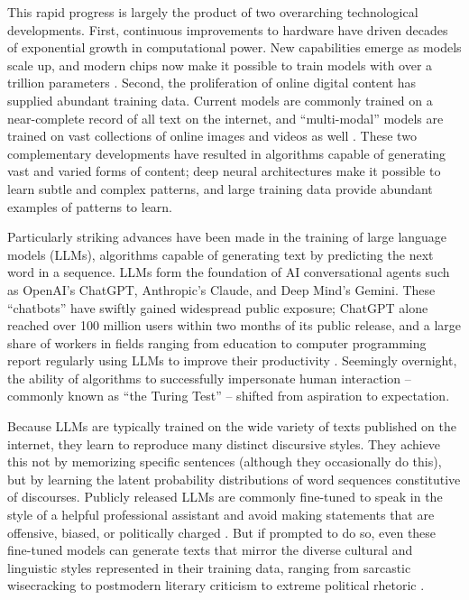\documentclass{article}
\begin{document}
This rapid progress is largely the product of two overarching
technological developments. First, continuous improvements to hardware
have driven decades of exponential growth in computational power. New
capabilities emerge as models scale up, and modern chips now make it
possible to train models with over a trillion parameters \parencite{Kaplan2020-lo}.
Second, the proliferation of online digital content has supplied
abundant training data. Current models are commonly trained on a
near-complete record of all text on the internet, and ``multi-modal''
models are trained on vast collections of online images and videos as
well \parencite{Brown2020-nh}. These two complementary developments have
resulted in algorithms capable of generating vast and varied forms of
content; deep neural architectures make it possible to learn subtle and
complex patterns, and large training data provide abundant examples of
patterns to learn.

Particularly striking advances have been made in the training of large
language models (LLMs), algorithms capable of generating text by
predicting the next word in a sequence. LLMs form the foundation of AI
conversational agents such as OpenAI's ChatGPT, Anthropic's Claude, and
Deep Mind's Gemini. These ``chatbots'' have swiftly gained widespread
public exposure; ChatGPT alone reached over 100 million users within two
months of its public release, and a large share of workers in fields
ranging from education to computer programming report regularly using
LLMs to improve their productivity
\parencite{DellAcqua2023-fo, Mollick2023-wy}. Seemingly overnight, the ability of
algorithms to successfully impersonate human interaction -- commonly
known as ``the Turing Test'' \parencite{Turing1950-in} -- shifted
from aspiration to expectation.

Because LLMs are typically trained on the wide variety of texts
published on the internet, they learn to reproduce many distinct
discursive styles. They achieve this not by memorizing specific
sentences (although they occasionally do this), but by learning the
latent probability distributions of word sequences constitutive of
discourses. Publicly released LLMs are commonly fine-tuned to speak in
the style of a helpful professional assistant and avoid making
statements that are offensive, biased, or politically charged
\parencite{Ouyang2022-xw}. But if
prompted to do so, even these fine-tuned models can generate texts that
mirror the diverse cultural and linguistic styles represented in their
training data, ranging from sarcastic wisecracking to postmodern
literary criticism to extreme political rhetoric \parencite{Argyle2023-ii, Kim2023-ji, Park2022-py}.
\end{document}
